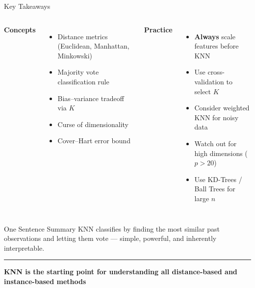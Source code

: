 \documentclass[8pt,aspectratio=169]{beamer}
\newcommand{\bottomnote}[1]{%
\vfill
\vspace{-2mm}
\textcolor{mllavender2}{\rule{\textwidth}{0.4pt}}
\vspace{1mm}
\footnotesize
\textbf{#1}
}
\newenvironment{compactlist}{%
  \begin{itemize}%
    \setlength{\itemsep}{2pt}%
    \setlength{\parskip}{0pt}%
    \setlength{\parsep}{0pt}%
}{%
  \end{itemize}%
}
\newcommand{\highlight}[1]{\textcolor{mlorange}{\textbf{#1}}}
\begin{document}
\begin{frame}[t]{Key Takeaways}
\begin{columns}[T]
\small
\textcolor{mlpurple}{\textbf{Concepts}}

\footnotesize
\begin{compactlist}
\item \footnotesize Distance metrics (Euclidean, Manhattan, Minkowski)
\item \footnotesize Majority vote classification rule
\item \footnotesize Bias--variance tradeoff via $K$
\item \footnotesize Curse of dimensionality
\item \footnotesize Cover--Hart error bound
\end{compactlist}

\small
\textcolor{mlpurple}{\textbf{Practice}}

\footnotesize
\begin{compactlist}
\item \footnotesize \highlight{Always} scale features before KNN
\item \footnotesize Use cross-validation to select $K$
\item \footnotesize Consider weighted KNN for noisy data
\item \footnotesize Watch out for high dimensions ($p > 20$)
\item \footnotesize Use KD-Trees / Ball Trees for large $n$
\end{compactlist}
\end{columns}

\vspace{4mm}
\begin{block}{One Sentence Summary}
\footnotesize KNN classifies by finding the most similar past observations and letting them vote --- simple, powerful, and inherently interpretable.
\end{block}
\bottomnote{KNN is the starting point for understanding all distance-based and instance-based methods}
\end{frame}
\end{document}
